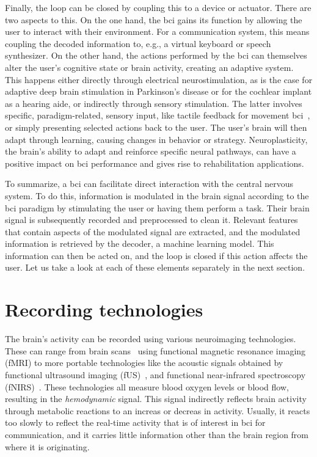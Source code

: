 Finally, the loop can be closed by coupling this to a device or actuator.
There are two aspects to this.
On the one hand, the \ac{bci} gains its function by allowing the user to interact with
their environment.
For a communication system, this means coupling the decoded information to, e.g., a
virtual keyboard or speech synthesizer.
On the other hand, the actions performed by the \ac{bci} can themselves alter the user's
cognitive state or brain activity, creating an adaptive system.
This happens either directly through electrical neurostimulation, as is the
case for adaptive deep brain stimulation in Parkinson's disease or for the
cochlear implant as a hearing aide, or indirectly through sensory stimulation.
The latter involves specific, paradigm-related, sensory input, like tactile feedback for
movement \ac{bci}~\cite{Flesher2021}, or simply presenting selected actions back to the
user.
The user's brain will then adapt through learning, causing changes in
behavior or strategy.
Neuroplasticity, the brain's ability to adapt and reinforce specific neural pathways,
can have a positive impact on \ac{bci} performance and gives rise to rehabilitation
applications.

To summarize, a \ac{bci} can facilitate direct interaction with the central nervous
system.
To do this, information is modulated in the brain signal according to the \ac{bci}
paradigm by stimulating the user or having them perform a task.
Their brain signal is subsequently recorded and preprocessed to clean it.
Relevant features that contain aspects of the modulated signal are extracted, and the
modulated information is retrieved by the decoder, a machine learning model.
This information can then be acted on, and the loop is closed if this action affects the
user.
Let us take a look at each of these elements separately in the next section.

\section{Recording technologies}
\label{sec:bci-recording}

The brain's activity can be recorded using various neuroimaging technologies.
These can range from brain scans~\cite{Weiskopf2004} using functional magnetic resonance
imaging (fMRI) to more portable technologies like the acoustic signals obtained by
functional ultrasound imaging (fUS)~\cite{Zheng2023}, and functional near-infrared spectroscopy
(fNIRS)~\cite{Borgheai2020}.
These technologies all measure blood oxygen levels or blood flow, resulting in the
\emph{hemodynamic} signal.
This signal indirectly reflects brain activity through
metabolic reactions to an increas or decreas in activity.
Usually, it reacts too slowly to reflect the real-time activity that is of interest in
\ac{bci} for communication, and it carries little information other than the brain
region from where it is originating.

